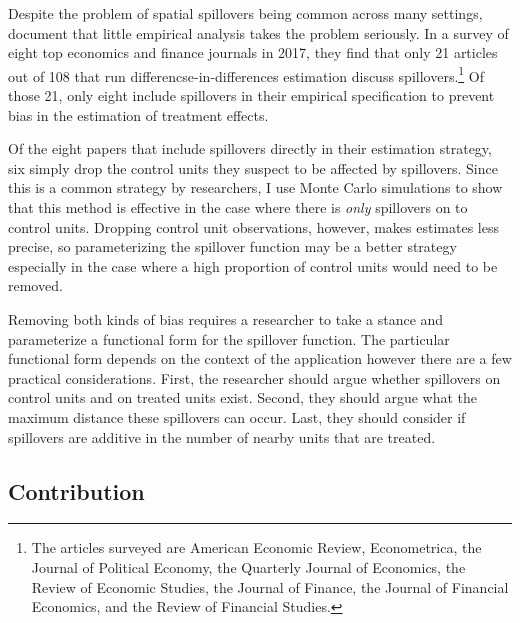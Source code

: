 \documentclass[11pt]{article}
\begin{document}
Despite the problem of spatial spillovers being common across many settings, \citet{Berg_Streitz_2019} document that little empirical analysis takes the problem seriously. In a survey of eight top economics and finance journals in 2017, they find that only 21 articles out of 108 that run differencse-in-differences estimation discuss spillovers.\footnote{The articles surveyed are American Economic Review, Econometrica, the Journal of Political Economy, the Quarterly Journal of Economics, the Review of Economic Studies, the Journal of Finance, the Journal of Financial Economics, and the Review of Financial Studies.} Of those 21, only eight include spillovers in their empirical specification to prevent bias in the estimation of treatment effects.

Of the eight papers that include spillovers directly in their estimation strategy, six simply drop the control units they suspect to be affected by spillovers. Since this is a common strategy by researchers, I use Monte Carlo simulations to show that this method is effective in the case where there is \textit{only} spillovers on to control units. Dropping control unit observations, however, makes estimates less precise, so parameterizing the spillover function may be a better strategy especially in the case where a high proportion of control units would need to be removed.

Removing both kinds of bias requires a researcher to take a stance and parameterize a functional form for the spillover function. The particular functional form depends on the context of the application however there are a few practical considerations. First, the researcher should argue whether spillovers on control units and on treated units exist. Second, they should argue what the maximum distance these spillovers can occur. Last, they should consider if spillovers are additive in the number of nearby units that are treated.

\subsection{Contribution}
\end{document}
